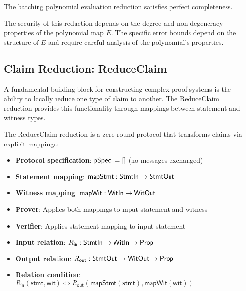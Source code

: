 \begin{theorem}
    The batching polynomial evaluation reduction satisfies perfect completeness.
\end{theorem}

\begin{remark}
    The security of this reduction depends on the degree and non-degeneracy properties of the polynomial map $E$. The specific error bounds depend on the structure of $E$ and require careful analysis of the polynomial's properties.
\end{remark}

\subsection{Claim Reduction: ReduceClaim}

A fundamental building block for constructing complex proof systems is the ability to locally reduce one type of claim to another. The ReduceClaim reduction provides this functionality through mappings between statement and witness types.

\begin{definition}
    \label{def:reduceclaim_reduction}
    The ReduceClaim reduction is a zero-round protocol that transforms claims via explicit mappings:
    \begin{itemize}
        \item \textbf{Protocol specification}: $\mathsf{pSpec} := []$ (no messages exchanged)
        \item \textbf{Statement mapping}: $\mathsf{mapStmt} : \mathsf{StmtIn} \to \mathsf{StmtOut}$
        \item \textbf{Witness mapping}: $\mathsf{mapWit} : \mathsf{WitIn} \to \mathsf{WitOut}$
        \item \textbf{Prover}: Applies both mappings to input statement and witness
        \item \textbf{Verifier}: Applies statement mapping to input statement
        \item \textbf{Input relation}: $R_{\mathsf{in}} : \mathsf{StmtIn} \to \mathsf{WitIn} \to \mathsf{Prop}$
        \item \textbf{Output relation}: $R_{\mathsf{out}} : \mathsf{StmtOut} \to \mathsf{WitOut} \to \mathsf{Prop}$
        \item \textbf{Relation condition}: $R_{\mathsf{in}}(\mathsf{stmt}, \mathsf{wit}) \iff R_{\mathsf{out}}(\mathsf{mapStmt}(\mathsf{stmt}), \mathsf{mapWit}(\mathsf{wit}))$
    \end{itemize}
\end{definition}

